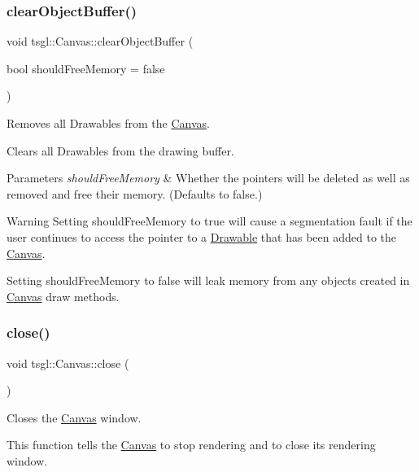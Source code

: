 \subsubsection{\texorpdfstring{clear\+Object\+Buffer()}{clearObjectBuffer()}}
{\footnotesize\ttfamily void tsgl\+::\+Canvas\+::clear\+Object\+Buffer (\begin{DoxyParamCaption}\item[{bool}]{should\+Free\+Memory = {\ttfamily false} }\end{DoxyParamCaption})}



Removes all Drawables from the \hyperlink{classtsgl_1_1_canvas}{Canvas}. 

Clears all Drawables from the drawing buffer. 
\begin{DoxyParams}{Parameters}
{\em should\+Free\+Memory} & Whether the pointers will be deleted as well as removed and free their memory. (Defaults to false.) \\
\hline
\end{DoxyParams}
\begin{DoxyWarning}{Warning}
Setting should\+Free\+Memory to true will cause a segmentation fault if the user continues to access the pointer to a \hyperlink{classtsgl_1_1_drawable}{Drawable} that has been added to the \hyperlink{classtsgl_1_1_canvas}{Canvas}. 

Setting should\+Free\+Memory to false will leak memory from any objects created in \hyperlink{classtsgl_1_1_canvas}{Canvas} draw methods. 
\end{DoxyWarning}
\mbox{\label{classtsgl_1_1_canvas_afaa1250b1da6b48b9c170a0655191938}} 
\subsubsection{\texorpdfstring{close()}{close()}}
{\footnotesize\ttfamily void tsgl\+::\+Canvas\+::close (\begin{DoxyParamCaption}{ }\end{DoxyParamCaption})}



Closes the \hyperlink{classtsgl_1_1_canvas}{Canvas} window. 

This function tells the \hyperlink{classtsgl_1_1_canvas}{Canvas} to stop rendering and to close its rendering window.


